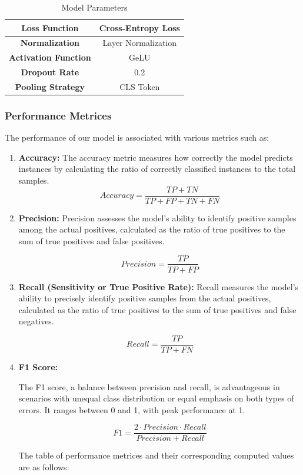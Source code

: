 \begin{table}[h]
\begin{tabular}{|c|c|}
        \hline
        \textbf{Loss Function}                  & Cross-Entropy Loss  \\
        \hline
        \textbf{Normalization}                  & Layer Normalization \\
        \hline
        \textbf{Activation Function}            & GeLU                \\
        \hline
        \textbf{Dropout Rate }                  & 0.2                 \\
        \hline
        \textbf{Pooling Strategy }              & CLS Token           \\
        \hline
    \end{tabular}
    \caption{Model Parameters}
    \label{tab:model-parameters}
\end{table}
\newpage
\subsubsection{Performance Metrices}

The performance of our model is associated with various metrics such as:
\begin{enumerate}
    \item \textbf{Accuracy:}
          The accuracy metric measures how correctly the model predicts instances by calculating the ratio of correctly classified instances to the total samples.
          \[ Accuracy = \frac{TP + TN}{TP + FP + TN + FN} \]

    \item \textbf{Precision:}
          Precision assesses the model's ability to identify positive samples among the actual positives, calculated as the ratio of true positives to the sum of true positives and false positives.

          \[ Precision = \frac{TP}{TP + FP} \]

    \item \textbf{Recall (Sensitivity or True Positive Rate):}
          Recall measures the model's ability to precisely identify positive samples from the actual positives, calculated as the ratio of true positives to the sum of true positives and false negatives.

          \[ Recall = \frac{TP}{TP + FN} \]


    \item \textbf{F1 Score:}

          The F1 score, a balance between precision and recall, is advantageous in scenarios with unequal class distribution or equal emphasis on both types of errors. It ranges between 0 and 1, with peak performance at 1.

          \[ F1 = \frac{2 \cdot Precision \cdot Recall}{Precision + Recall} \]

          The table of performance metrices and their corresponding computed values are as follows:
\end{enumerate}

